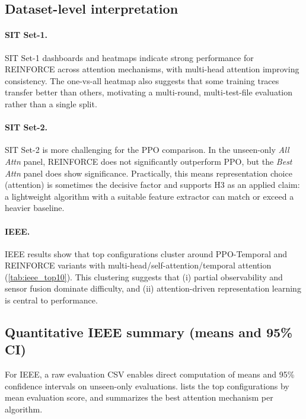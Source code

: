 \documentclass[11pt]{article}
\begin{document}
\subsection{Dataset-level interpretation}
\label{sec:dataset_interpretation}
\paragraph{SIT Set-1.}
SIT Set-1 dashboards and heatmaps indicate strong performance for REINFORCE across attention mechanisms, with multi-head attention improving consistency. The one-vs-all heatmap also suggests that some training traces transfer better than others, motivating a multi-round, multi-test-file evaluation rather than a single split.

\paragraph{SIT Set-2.}
SIT Set-2 is more challenging for the PPO comparison. In the unseen-only \emph{All Attn} panel, REINFORCE does not significantly outperform PPO, but the \emph{Best Attn} panel does show significance. Practically, this means representation choice (attention) is sometimes the decisive factor and supports H3 as an applied claim: a lightweight algorithm with a suitable feature extractor can match or exceed a heavier baseline.

\paragraph{IEEE.}
IEEE results show that top configurations cluster around PPO-Temporal and REINFORCE variants with multi-head/self-attention/temporal attention (\cref{tab:ieee_top10}). This clustering suggests that (i) partial observability and sensor fusion dominate difficulty, and (ii) attention-driven representation learning is central to performance.

\subsection{Quantitative IEEE summary (means and 95\% CI)}
\label{sec:ieee_summary}
For IEEE, a raw evaluation CSV enables direct computation of means and 95\% confidence intervals on unseen-only evaluations.  lists the top configurations by mean evaluation score, and  summarizes the best attention mechanism per algorithm.

\begin{table}[t]
	\centering
	\caption{Top IEEE configurations on unseen-only evaluations (mean and 95\% CI, aggregated across rounds and test files). Numbers are rounded to three decimals.}
	\label{tab:ieee_top10}
	
\end{table}
\end{document}
